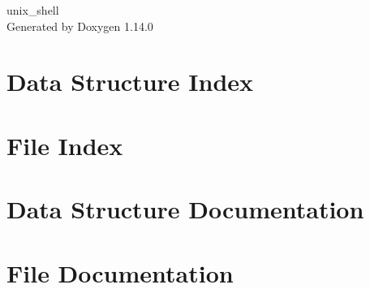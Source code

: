 \documentclass[twoside]{book}
\newcommand{\+}{\discretionary{\mbox{\scriptsize$\hookleftarrow$}}{}{}}
\newcommand{\clearemptydoublepage}{%
    \newpage{\pagestyle{empty}\cleardoublepage}%
  }
\begin{document}
  \raggedbottom
    \hypersetup{pageanchor=false,
                bookmarksnumbered=true,
                pdfencoding=unicode
               }
  \begin{titlepage}
  \vspace*{7cm}
  \begin{center}%
  {\Large unix\+\_\+shell}\\
  \vspace*{1cm}
  {\large Generated by Doxygen 1.14.0}\\
  \end{center}
  \end{titlepage}
  \clearemptydoublepage
  \tableofcontents
  \clearemptydoublepage
  \hypersetup{pageanchor=true}
\chapter{Data Structure Index}

\chapter{File Index}

\chapter{Data Structure Documentation}

\chapter{File Documentation}




  \backmatter
  \newpage
  \clearemptydoublepage
  \printindex
\end{document}
